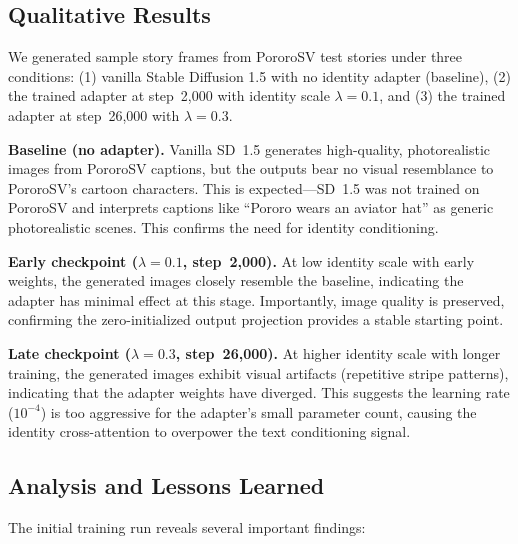 \documentclass[11pt]{article}
\begin{document}
\subsection{Qualitative Results}

We generated sample story frames from PororoSV test stories under three conditions: (1) vanilla Stable Diffusion 1.5 with no identity adapter (baseline), (2) the trained adapter at step~2,000 with identity scale $\lambda=0.1$, and (3) the trained adapter at step~26,000 with $\lambda=0.3$.

\textbf{Baseline (no adapter).} Vanilla SD~1.5 generates high-quality, photorealistic images from PororoSV captions, but the outputs bear no visual resemblance to PororoSV's cartoon characters. This is expected---SD~1.5 was not trained on PororoSV and interprets captions like ``Pororo wears an aviator hat'' as generic photorealistic scenes. This confirms the need for identity conditioning.

\textbf{Early checkpoint ($\lambda=0.1$, step~2,000).} At low identity scale with early weights, the generated images closely resemble the baseline, indicating the adapter has minimal effect at this stage. Importantly, image quality is preserved, confirming the zero-initialized output projection provides a stable starting point.

\textbf{Late checkpoint ($\lambda=0.3$, step~26,000).} At higher identity scale with longer training, the generated images exhibit visual artifacts (repetitive stripe patterns), indicating that the adapter weights have diverged. This suggests the learning rate ($10^{-4}$) is too aggressive for the adapter's small parameter count, causing the identity cross-attention to overpower the text conditioning signal.

\subsection{Analysis and Lessons Learned}

The initial training run reveals several important findings:
\end{document}
